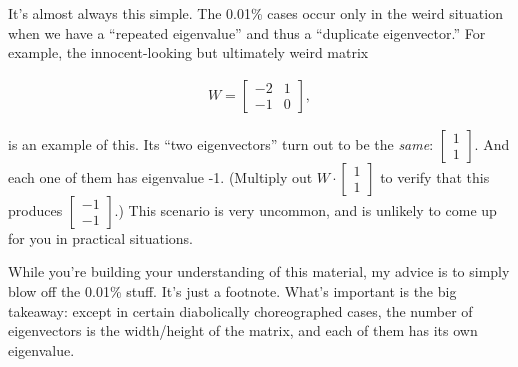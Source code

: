 
%

It's almost always this simple. The 0.01\% cases occur only in the weird
situation when we have a ``repeated eigenvalue'' and thus a ``duplicate
eigenvector.'' For example, the innocent-looking but ultimately weird matrix

\label{repeatedEigenvalue}
\vspace{-.25in}
\begin{align*}
W = \begin{bmatrix} -2 & 1 \\ -1 & 0 \end{bmatrix},
\end{align*}
\vspace{-.15in}

is an example of this. Its ``two eigenvectors'' turn out to be the
\textit{same}: {\scriptsize $\begin{bmatrix} 1 \\ 1 \end{bmatrix}$}. And each
one of them has eigenvalue -1. (Multiply out {\scriptsize $W\cdot
\begin{bmatrix} 1 \\ 1 \end{bmatrix}$} to verify that this produces
{\scriptsize $\begin{bmatrix} -1 \\ -1 \end{bmatrix}$}.) This scenario is 
very uncommon, and is unlikely to come up for you in practical situations.


\smallskip

While you're building your understanding of this material, my advice is to
simply blow off the 0.01\% stuff. It's just a footnote. What's important is the
big takeaway: except in certain diabolically choreographed cases, the number of
eigenvectors is the width/height of the matrix, and each of them has its own
eigenvalue.

